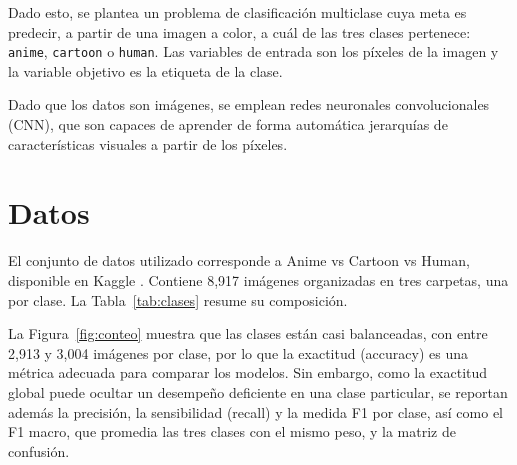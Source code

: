 \documentclass[letterpaper, 10 pt, conference]{ieeeconf}
\begin{document}
Dado esto, se plantea un problema de clasificación multiclase cuya meta es predecir, a partir de una imagen a color, a cuál de las tres clases pertenece: \texttt{anime}, \texttt{cartoon} o \texttt{human}. Las variables de entrada son los píxeles de la imagen y la variable objetivo es la etiqueta de la clase.

Dado que los datos son imágenes, se emplean redes neuronales convolucionales (CNN), que son capaces de aprender de forma automática jerarquías de características visuales a partir de los píxeles.


\section{Datos}

El conjunto de datos utilizado corresponde a Anime vs Cartoon vs Human, disponible en Kaggle \cite{dataset}. Contiene 8,917 imágenes organizadas en tres carpetas, una por clase. La Tabla~\ref{tab:clases} resume su composición.

\begin{table}[H]
\caption{Composición del conjunto de datos original}
\label{tab:clases}
\centering
\footnotesize
{}
\end{table}

La Figura~\ref{fig:conteo} muestra que las clases están casi balanceadas, con entre 2,913 y 3,004 imágenes por clase, por lo que la exactitud (accuracy) es una métrica adecuada para comparar los modelos. Sin embargo, como la exactitud global puede ocultar un desempeño deficiente en una clase particular, se reportan además la precisión, la sensibilidad (recall) y la medida F1 por clase, así como el F1 macro, que promedia las tres clases con el mismo peso, y la matriz de confusión.
\end{document}
